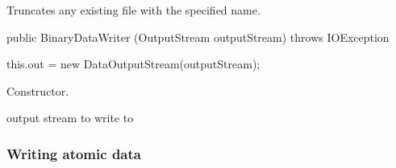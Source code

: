 \begin{tabb}
 Truncates any existing file with the specified name.
\end{tabb}
\begin{htmlonly}
\end{htmlonly}
\begin{code}

   public BinaryDataWriter (OutputStream outputStream) throws IOException \begin{hide} {
      this.out = new DataOutputStream(outputStream);
   }
   \end{hide}
\end{code}
\begin{tabb}
Constructor.
\end{tabb}
\begin{htmlonly}
 {output stream to write to}
\end{htmlonly}

   
\subsubsection*{Writing atomic data}

